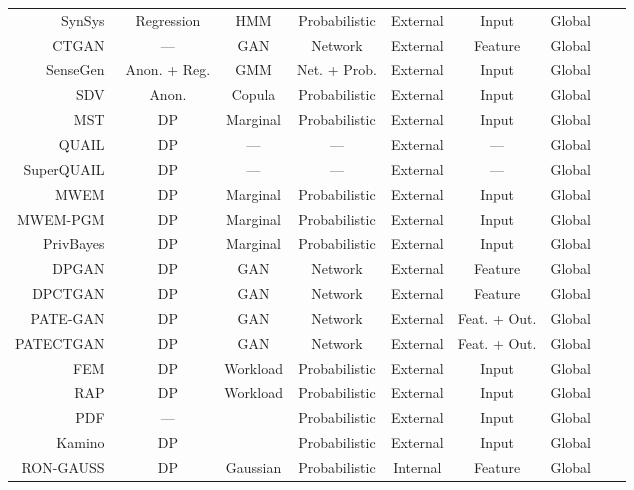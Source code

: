 \documentclass[parskip=full]{scrartcl}
\begin{document}
\begin{longtable}{rcccccccc}
    \bottomrule
    \endlastfoot
      SynSys~\cite{dahmen2019synsys} & Regression & HMM & Probabilistic & External & Input & Global \\
      CTGAN~\cite{xu2019modeling} & --- & GAN & Network & External & Feature & Global \\
      SenseGen~\cite{alzantot2017sensegen} & Anon. + Reg. & GMM & Net. + Prob. & External & Input & Global \\
      SDV~\cite{patki2016synthetic} & Anon. & Copula & Probabilistic & External & Input & Global \\
      MST~\cite{mckenna2021winning} & DP & Marginal & Probabilistic & External & Input & Global \\
      QUAIL~\cite{rosenblatt2020differentially} & DP & --- & --- & External & --- & Global \\
      SuperQUAIL~\cite{rosenblatt2022spending} & DP & --- & --- & External & --- & Global \\
      MWEM~\cite{hardt2012simple} & DP & Marginal & Probabilistic & External & Input & Global \\
      MWEM-PGM~\cite{mckenna2019graphical} & DP & Marginal & Probabilistic & External & Input & Global \\
      PrivBayes~\cite{zhang2017privbayes} & DP & Marginal & Probabilistic & External & Input & Global \\
      DPGAN~\cite{xie2018differentially} & DP & GAN & Network & External & Feature & Global \\
      DPCTGAN~\cite{rosenblatt2020differentially} & DP & GAN &  Network & External & Feature & Global \\
      PATE-GAN~\cite{jordon2018pate} & DP & GAN & Network & External & Feat. + Out. & Global \\
      PATECTGAN~\cite{rosenblatt2020differentially} & DP & GAN & Network & External & Feat. + Out. & Global \\
      FEM~\cite{vietri2020new} & DP & Workload & Probabilistic & External & Input & Global \\
      RAP~\cite{aydore2021differentially} & DP & Workload & Probabilistic & External & Input & Global \\
      PDF~\cite{de2019formal, suciu2011probabilistic} & --- &  & Probabilistic & External & Input & Global \\
      Kamino~\cite{ge2021kamino} & DP  &  & Probabilistic & External & Input & Global \\
      RON-GAUSS~\cite{chanyaswad2019ron} & DP & Gaussian & Probabilistic & Internal & Feature & Global \\

\end{longtable}
\end{document}
